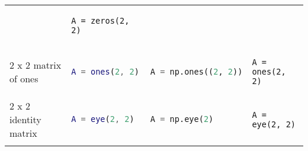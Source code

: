 \documentclass[10pt, landscape]{article}
\begin{document}
\begin{multicols}{2}
\begin{tabular}[]{@{}llll@{}}
\begin{minipage}[t]{0.25\columnwidth}
\strut
\end{minipage} & \begin{minipage}[t]{0.20\columnwidth}\raggedright\strut
\begin{lstlisting}
A = zeros(2, 2)
\end{lstlisting}
\strut
\end{minipage}\tabularnewline
\begin{minipage}[t]{0.24\columnwidth}\raggedright\strut
2 x 2 matrix of ones\strut
\end{minipage} & \begin{minipage}[t]{0.20\columnwidth}\raggedright\strut
\begin{lstlisting}[language=Matlab]
A = ones(2, 2)
\end{lstlisting}
\strut
\end{minipage} & \begin{minipage}[t]{0.25\columnwidth}\raggedright\strut
\begin{lstlisting}[language=Python]
A = np.ones((2, 2))
\end{lstlisting}
\strut
\end{minipage} & \begin{minipage}[t]{0.20\columnwidth}\raggedright\strut
\begin{lstlisting}
A = ones(2, 2)
\end{lstlisting}
\strut
\end{minipage}\tabularnewline
\begin{minipage}[t]{0.24\columnwidth}\raggedright\strut
2 x 2 identity matrix\strut
\end{minipage} & \begin{minipage}[t]{0.20\columnwidth}\raggedright\strut
\begin{lstlisting}[language=Matlab]
A = eye(2, 2)
\end{lstlisting}
\strut
\end{minipage} & \begin{minipage}[t]{0.25\columnwidth}\raggedright\strut
\begin{lstlisting}[language=Python]
A = np.eye(2)
\end{lstlisting}
\strut
\end{minipage} & \begin{minipage}[t]{0.20\columnwidth}\raggedright\strut
\begin{lstlisting}
A = eye(2, 2)
\end{lstlisting}
\strut
\end{minipage}\tabularnewline
\begin{minipage}[t]{0.24\columnwidth}\raggedright\strut

\end{minipage}
\end{tabular}
\end{multicols}
\end{document}
